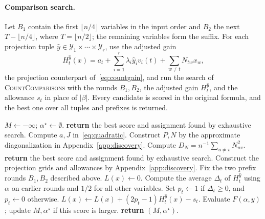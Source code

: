 \documentclass[11pt,a4paper]{article}
\theoremstyle{definition}
\theoremstyle{remark}
\begin{document}
\paragraph{Comparison search.}
Let $B_1$ contain the first $\lfloor n/4\rfloor$ variables in the input
order and $B_2$ the next $T-\lfloor n/4\rfloor$, where
$T=\lfloor n/2\rfloor$; the remaining variables form the suffix. For each
projection tuple $\hat y\in\mathcal Y_1\times\cdots\times\mathcal Y_r$, use
the adjusted gain
\begin{equation}
 H_t^{\hat y}(x)
 =a_t+\sum_{i=1}^{r}\lambda_i\hat y_i v_i(t)
                 +\sum_{w\ne t}N_{tw}x_w,
                 \label{eq:community_gain}
\end{equation}
the projection counterpart of~\eqref{eq:countgain}, and run the search of
\textnormal{\textsc{CountComparisons}} with the rounds $B_1,B_2$, the
adjusted gain $H_t^{\hat y}$, and the allowance $s_t$ in place of $|\beta|$.
Every candidate is scored in the original formula, and the best one over
all tuples and prefixes is returned.

\begin{algorithm}[tp]
\caption{\textnormal{\textsc{CommunityComparisons}}$(F,k,\chi)$}
\label{alg:communities}
\begin{algorithmic}[1]
\STATE $M\gets-\infty$; $\alpha^\star\gets\emptyset$.
  \STATE \textbf{return} the best score and assignment found by exhaustive search.
\ENDIF
\STATE Compute $a,J$ in~\eqref{eq:quadratic}.
\STATE Construct $P,N$ by the approximate diagonalization in Appendix~\ref{app:discovery}.
\STATE Compute $D_N=n^{-1}\sum_{u\ne v}N_{uv}^2$.
  \STATE \textbf{return} the best score and assignment found by exhaustive search.
\ENDIF
\STATE Construct the projection grids and allowances by Appendix~\ref{app:discovery}.
\STATE Fix the two prefix rounds $B_1,B_2$ described above.
    \STATE $L(x)\gets0$.
      \STATE Compute the average $\Delta_t$ of $H_t^{\hat y}$ using $\alpha$ on earlier rounds and $1/2$ for all other variables.
      \STATE Set $p_t\gets1$ if $\Delta_t\ge0$, and $p_t\gets0$ otherwise.
        \STATE $L(x)\gets L(x)+(2p_t-1)H_t^{\hat y}(x)-s_t$.
      \ENDIF
    \ENDFOR
      \STATE Evaluate $F(\alpha,y)$; update $M,\alpha^\star$ if this score is larger.
    \ENDFOR
  \ENDFOR
\ENDFOR
\STATE \textbf{return} $(M,\alpha^\star)$.
\end{algorithmic}
\end{algorithm}
\end{document}
